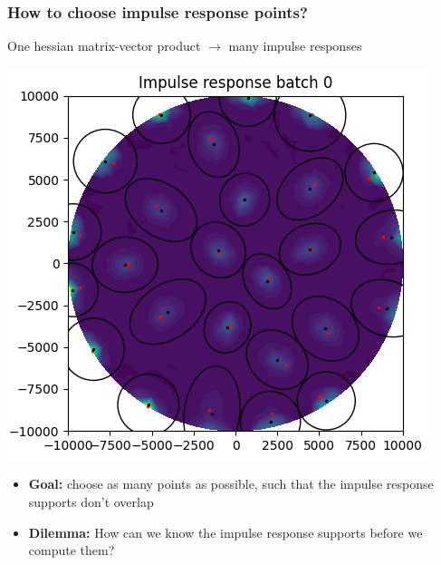 \documentclass[10pt,final,xcolor=dvipsnames]{beamer}
\begin{document}
\begin{frame}
	\frametitle{How to choose impulse response points?}
	One hessian matrix-vector product $\rightarrow$ many impulse responses
	\begin{center}
		\includegraphics[width=0.5\columnwidth]{impulseresponse0.png} 
	\end{center}
	\begin{itemize}
		\item \textbf{Goal:} choose as many points as possible, such that the impulse response supports don't overlap
		\item \textbf{Dilemma:} How can we know the impulse response supports before we compute them?
	\end{itemize}
\end{frame}
\end{document}
